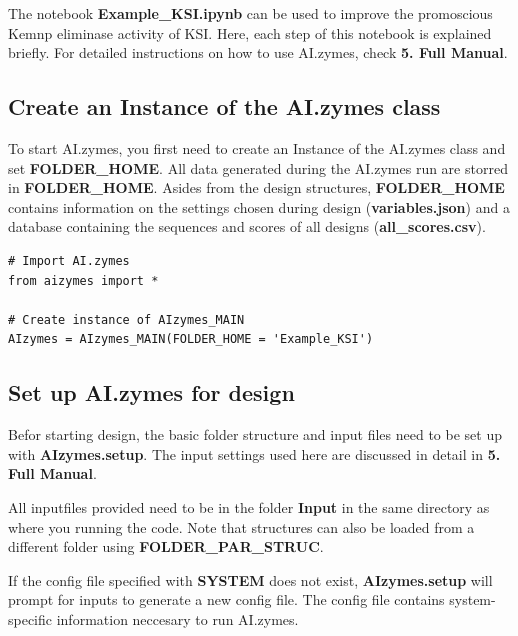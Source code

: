 \documentclass[10pt]{extarticle}
\begin{document}
The notebook \textbf{Example\_KSI.ipynb} can be used to improve the promoscious Kemnp eliminase activity of KSI. Here, each step of this notebook is explained briefly. For detailed instructions on how to use AI.zymes, check \textbf{5. Full Manual}.

\subsection{Create an Instance of the AI.zymes class}

To start AI.zymes, you first need to create an Instance of the AI.zymes class and set \textbf{FOLDER\_HOME}.
All data generated during the AI.zymes run are storred in \textbf{FOLDER\_HOME}.
Asides from the design structures, \textbf{FOLDER\_HOME} contains information on the settings chosen during design (\textbf{variables.json})
and a database containing the sequences and scores of all designs (\textbf{all\_scores.csv}).

\vspace*{0.5\baselineskip}
\begin{lstlisting}[basicstyle=\color{black}\fontsize{9}{11}\selectfont\ttfamily, frame=single, rulecolor=\color{black}, breaklines=true]
# Import AI.zymes
from aizymes import * 
         
# Create instance of AIzymes_MAIN
AIzymes = AIzymes_MAIN(FOLDER_HOME = 'Example_KSI') 
\end{lstlisting}
\vspace*{0.5\baselineskip}

\subsection{Set up AI.zymes for design}

Befor starting design, the basic folder structure and input files need to be set up with \textbf{AIzymes.setup}. The input settings used here are discussed in detail in \textbf{5. Full Manual}.

\begin{tcolorbox}[colback=mpgAccentGreen!20!white,colframe=mpgAccentGreen!80!black,title=Important]
All inputfiles provided need to be in the folder \textbf{Input} in the same directory as where you running the code.
Note that structures can also be loaded from a different folder using \textbf{FOLDER\_PAR\_STRUC}.
\end{tcolorbox}

\begin{tcolorbox}[colback=mpgAccentBlue!20!white,colframe=mpgAccentBlue!80!black,title=Note]
If the config file specified with \textbf{SYSTEM} does not exist,
\textbf{AIzymes.setup} will prompt for inputs to generate a new config file.
The config file contains system-specific information neccesary to run AI.zymes.
\end{tcolorbox}
\end{document}
